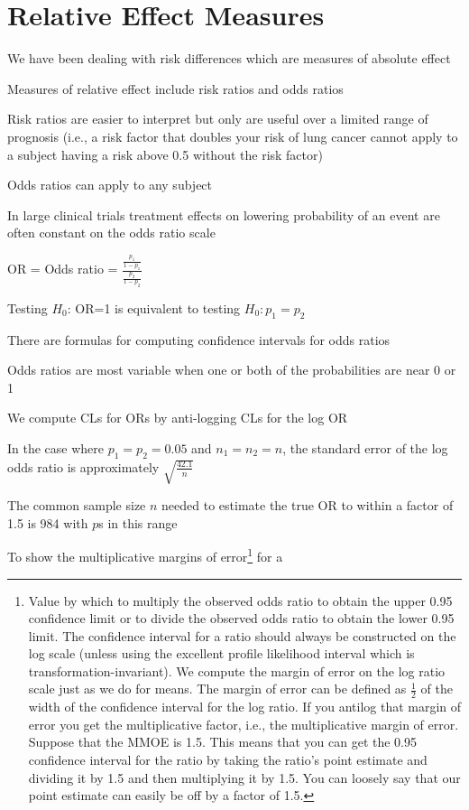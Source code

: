 \section{Relative Effect Measures}
\bi
\item We have been dealing with risk differences which are measures of
  absolute effect
\item Measures of relative effect include risk ratios and odds ratios
\item Risk ratios are easier to interpret but only are useful over a
  limited range of prognosis (i.e., a risk factor that doubles your
  risk of lung cancer cannot apply to a subject having a risk above
  0.5 without the risk factor)
\item Odds ratios can apply to any subject
\item In large clinical trials treatment effects on lowering
  probability of an event are often constant on the odds ratio scale
\item OR = Odds ratio =
  $\frac{\frac{p_{1}}{1-p_{1}}}{\frac{p_{2}}{1-p_{2}}}$
\item Testing $H_{0}$: OR=1 is equivalent to testing
  $H_{0}:p_{1}=p_{2}$
\item There are formulas for computing confidence intervals for odds
  ratios
\item Odds ratios are most variable when one or both of the
  probabilities are near 0 or 1
\item We compute CLs for ORs by anti-logging CLs for the log OR
\item In the case where $p_{1}=p_{2}=0.05$ and $n_{1}=n_{2}=n$, the
  standard error of the log odds ratio is approximately
  $\sqrt{\frac{42.1}{n}}$
\item The common sample size $n$ needed to estimate the true OR to
  within a factor of 1.5 is 984 with $p$s in this range
\item To show the multiplicative margins of error\footnote{Value by
    which to multiply the observed odds ratio to obtain the upper 0.95
    confidence limit or to divide the observed odds ratio to obtain
    the lower 0.95 limit.  The confidence interval for a ratio should
    always be constructed on the log scale (unless using the excellent
    profile likelihood interval which is transformation-invariant).
    We compute the margin of error on the log ratio scale just as we
    do for means.  The margin of error can be defined as $\frac{1}{2}$
    of the width of the confidence interval for the log ratio. If you
    antilog that margin of error you get the multiplicative factor,
    i.e., the multiplicative margin of error.  Suppose that the MMOE
    is 1.5. This means that you can get the 0.95 confidence interval
    for the ratio by taking the ratio’s point estimate and dividing it
    by 1.5 and then multiplying it by 1.5. You can loosely say that
    our point estimate can easily be off by a factor of 1.5.} for a
